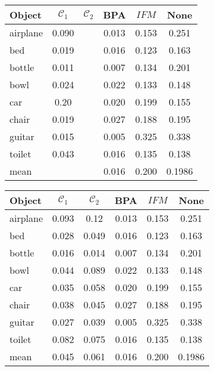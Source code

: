 \begin{center}
     \label{tab:distance256} 
    \begin{tabular}{| l  | c  | c | c | c || c |}
        \hline
        Object& $\mathcal{C}_1$ & $\mathcal{C}_2$ & BPA & $IFM$  & None\\ \hline
        airplane&0.090&&0.013&0.153&0.251\\\hline
        bed&0.019&&0.016&0.123&0.163\\\hline 
        bottle&0.011&&0.007&0.134&0.201\\\hline
        bowl&0.024&&0.022&0.133&0.148\\\hline
        car&0.20&&0.020&0.199&0.155\\\hline
        chair&0.019&&0.027&0.188&0.195\\\hline
        guitar&0.015&&0.005&0.325&0.338\\\hline
        toilet&0.043&&0.016&0.135&0.138\\\hline\hline
        mean&&&0.016&0.200&0.1986\\        \hline
    \end{tabular}
\end{center}

\begin{center}
     \label{tab:distance256} 
    \begin{tabular}{| l  | c  | c | c | c || c |}
        \hline
        Object& $\mathcal{C}_1$ & $\mathcal{C}_2$ & BPA & $IFM$  & None\\ \hline
        airplane&0.093&0.12&0.013&0.153&0.251\\\hline
        bed&0.028&0.049&0.016&0.123&0.163\\\hline 
        bottle&0.016&0.014&0.007&0.134&0.201\\\hline
        bowl&0.044&0.089&0.022&0.133&0.148\\\hline
        car&0.035&0.058&0.020&0.199&0.155\\\hline
        chair&0.038&0.045&0.027&0.188&0.195\\\hline
        guitar&0.027&0.039&0.005&0.325&0.338\\\hline
        toilet&0.082&0.075&0.016&0.135&0.138\\\hline\hline
        mean&0.045&0.061&0.016&0.200&0.1986\\        \hline
    \end{tabular}
\end{center}

